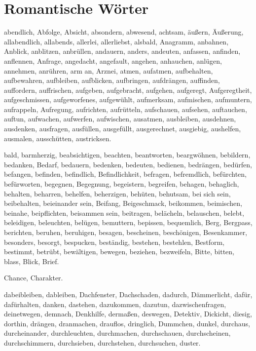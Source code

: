\documentclass[a4paper,10pt,fleqn,twocolumn,twoside,dvipdfmx]{scrartcl}
\begin{document}
\section*{Romantische Wörter}

\noindent
abendlich,
Abfolge,
Absicht,
absondern,
abwesend,
achtsam,
äußern,
Äußerung,
allabendlich,
allabends,
allerlei,
allerliebst,
alsbald,
Anagramm,
anbahnen,
Anblick,
anblitzen,
anbrüllen,
andauern,
anders,
andeuten,
anfassen,
anfinden,
anflennen,
Anfrage,
angedacht,
angefault,
angehen,
anhauchen,
anlügen,
annehmen,
anrühren,
arm an,
Arznei,
atmen,
aufatmen,
aufbehalten,
aufbewahren,
aufbleiben,
aufblicken,
aufbringen,
aufdrängen,
auffinden,
auffordern,
auffrischen,
aufgeben,
aufgebracht,
aufgehen,
aufgeregt,
Aufgeregtheit,
aufgeschmissen,
aufgeworfenes,
aufgewühlt,
aufmerksam,
aufmischen,
aufmuntern,
aufrappeln,
Aufregung,
aufrichten,
aufrütteln,
aufschauen,
aufsehen,
auftauchen,
auftun,
aufwachen,
aufwerfen,
aufwischen,
ausatmen,
ausbleiben,
ausdehnen,
ausdenken,
ausfragen,
ausfüllen,
ausgefüllt,
ausgerechnet,
ausgiebig,
aushelfen,
ausmalen,
ausschütten,
austricksen.

bald,
barmherzig,
beabsichtigen,
beachten,
beantworten,
beargwöhnen,
bebildern,
bedanken,
Bedarf,
bedauern,
bedenken,
bedeuten,
bedienen,
bedrängen,
bedürfen,
befangen,
befinden,
befindlich,
Befindlichkeit,
befragen,
befremdlich,
befürchten,
befürworten,
begegnen,
Begegnung,
begeistern,
begreifen,
behagen,
behaglich,
behalten,
beharren,
behelfen,
beherzigen,
behüten,
behutsam,
bei sich sein,
beibehalten,
beieinander sein,
Beifang,
Beigeschmack,
beikommen,
beimischen,
beinahe,
beipflichten,
beisammen sein,
beitragen,
belächeln,
belauschen,
belebt,
beleidigen,
beleuchten,
belügen,
bemuttern,
bepissen,
bequemlich,
Berg,
Bergpass,
berichten,
beruhen,
beruhigen,
besagen,
bescheinen,
beschönigen,
Besenkammer,
besonders,
besorgt,
bespucken,
beständig,
bestehen,
bestehlen,
Bestform,
bestimmt,
betrübt,
bewältigen,
bewegen,
beziehen,
bezweifeln,
Bitte,
bitten,
blass,
Blick,
Brief.

Chance,
Charakter.

dabeibleiben,
dableiben,
Dachfenster,
Dachschaden,
dadurch,
Dämmerlicht,
dafür,
dafürhalten,
danken,
dastehen,
dazukommen,
dazutun,
dazwischenfragen,
deinetwegen,
demnach,
Denkhilfe,
dermaßen,
deswegen,
Detektiv,
Dickicht,
diesig,
dorthin,
drängen,
dranmachen,
drauflos,
dringlich,
Dummchen,
dunkel,
durchaus,
durcheinander,
durchleuchten,
durchmachen,
durchschauen,
durchscheinen,
durchschimmern,
durchsieben,
durchstehen,
durchsuchen,
duster.
\end{document}
